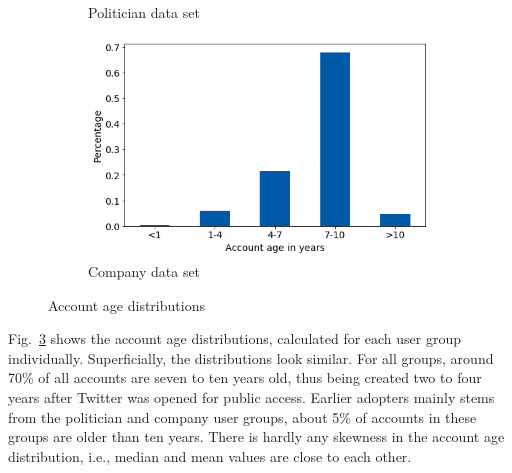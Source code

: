 \begin{figure}[h]
\begin{subfigure}{.33\textwidth}
  \caption{Politician data set}
  \label{fig:age_distr_sub2}
\end{subfigure}
\begin{subfigure}{.33\textwidth}
  \includegraphics[width=.95\linewidth]{img/corp_age_distr}
  \caption{Company data set}
  \label{fig:age_distr_sub3}
\end{subfigure}%
\caption{Account age distributions}
\label{fig:age_distr}
\end{figure}

Fig.~\ref{fig:age_distr} shows the account age distributions, calculated for
each user group individually.
Superficially, the distributions look similar.
For all groups, around 70\% of all accounts are seven to ten years old, thus being
created two to four years after Twitter was opened for public access.
Earlier adopters mainly stems from the politician and company user groups, about
5\% of accounts in these groups are older than ten years.
There is hardly any skewness in the account age distribution, i.e., median and
mean values are close to each other.

